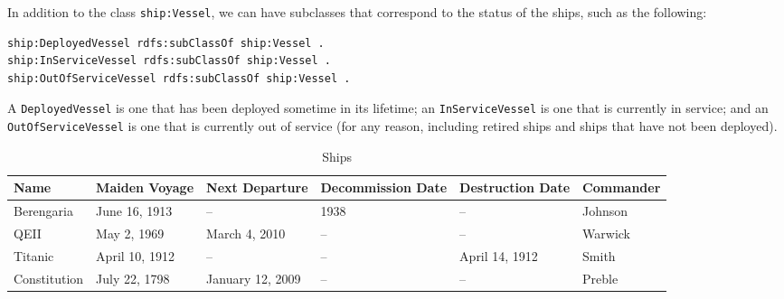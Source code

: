 In addition to the class \texttt{ship:Vessel}, we can have subclasses that
correspond to the status of the ships, such as the following:

\begin{lstlisting}
ship:DeployedVessel rdfs:subClassOf ship:Vessel .
ship:InServiceVessel rdfs:subClassOf ship:Vessel .
ship:OutOfServiceVessel rdfs:subClassOf ship:Vessel .
\end{lstlisting}

A \texttt{DeployedVessel} is one that has been deployed sometime in its lifetime;
an \texttt{InServiceVessel} is one that is currently in service; and an
\texttt{OutOfServiceVessel} is one that is currently out of service (for any
reason, including retired ships and ships that have not been deployed).

\begin{table}
\label{tab:ch8.1}
\begin{tabular}{|llllll|}
\hline
Name&Maiden Voyage&Next Departure&Decommission Date&Destruction Date&Commander\\
\hline
Berengaria&June 16, 1913&--&1938&--&Johnson\\
QEII&May 2, 1969&March 4, 2010&--&--&Warwick\\
Titanic&April 10, 1912&--&--&April 14, 1912&Smith\\
Constitution&July 22, 1798&January 12, 2009&--&--&Preble\\
\hline
\end{tabular}
\caption{Ships}
\end{table}

